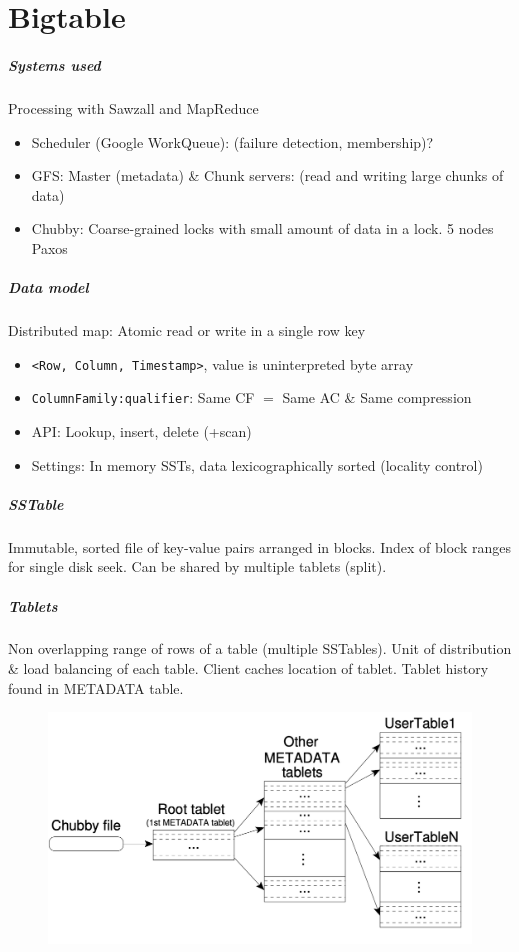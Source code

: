 \chapter{Bigtable}

\paragraph{Systems used} Processing with Sawzall and MapReduce
\begin{itemize}
\item Scheduler (Google WorkQueue): (failure detection, membership)?
\item GFS: Master (metadata) \& Chunk servers: (read and writing large chunks of
  data)
\item Chubby: Coarse-grained locks with small amount of data in a lock. 5 nodes
  Paxos
\end{itemize}

\paragraph{Data model} Distributed map: Atomic read or write in a single row key
\begin{itemize}
\item \texttt{<Row, Column, Timestamp>}, value is uninterpreted byte array
\item \texttt{ColumnFamily:qualifier}: Same CF $=$ Same AC \& Same compression
\item API: Lookup, insert, delete (+scan)
\item Settings: In memory SSTs, data lexicographically sorted (locality
  control)
\end{itemize}

\paragraph{SSTable}  Immutable, sorted file of key-value pairs arranged in
blocks. Index of block ranges for single disk seek. Can be shared by multiple
tablets (split).

\paragraph{Tablets} Non overlapping range of rows of a table (multiple
SSTables). Unit of distribution \& load balancing of each table. Client caches
location of tablet. Tablet history found in METADATA table.

\begin{figure}[h]
  \centering
  \includegraphics[width=0.4\linewidth]{img/bt-location.png}
\end{figure}

